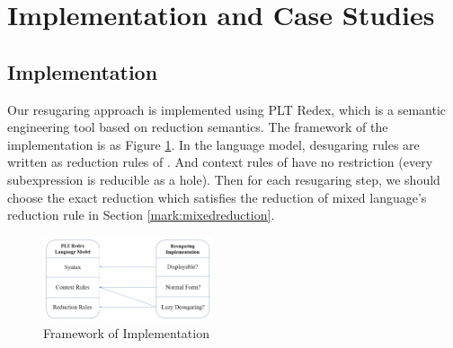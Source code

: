 \section{Implementation and Case Studies}
\label{sec5}


\subsection{Implementation}

Our resugaring approach is implemented using PLT Redex\cite{SEwPR}, which is a semantic engineering tool based on reduction semantics\cite{reduction}. The framework of the implementation is as Figure \ref{fig:frame}.
In the language model, desugaring rules are written as reduction rules of . And context rules of  have no restriction (every subexpression is reducible as a hole). Then for each resugaring step, we should choose the exact reduction which satisfies the reduction of mixed language's reduction rule  in Section \ref{mark:mixedreduction}.
\begin{figure}[t]
	\centering
	\includegraphics[width=5cm]{images/frame.png}
	\caption{Framework of Implementation}
	\label{fig:frame}
\end{figure}



